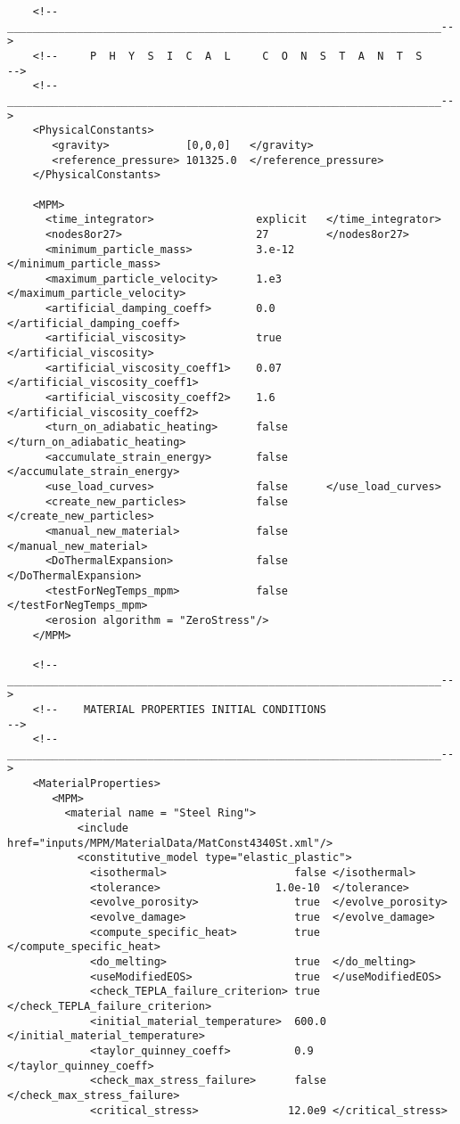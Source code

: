 \begin{verbatim}
    <!--____________________________________________________________________-->
    <!--     P  H  Y  S  I  C  A  L     C  O  N  S  T  A  N  T  S           -->
    <!--____________________________________________________________________-->   
    <PhysicalConstants>
       <gravity>            [0,0,0]   </gravity>
       <reference_pressure> 101325.0  </reference_pressure>
    </PhysicalConstants>

    <MPM>
      <time_integrator>                explicit   </time_integrator>
      <nodes8or27>                     27         </nodes8or27>
      <minimum_particle_mass>          3.e-12     </minimum_particle_mass>
      <maximum_particle_velocity>      1.e3       </maximum_particle_velocity>
      <artificial_damping_coeff>       0.0        </artificial_damping_coeff>
      <artificial_viscosity>           true       </artificial_viscosity>
      <artificial_viscosity_coeff1>    0.07       </artificial_viscosity_coeff1>
      <artificial_viscosity_coeff2>    1.6        </artificial_viscosity_coeff2>
      <turn_on_adiabatic_heating>      false      </turn_on_adiabatic_heating>
      <accumulate_strain_energy>       false      </accumulate_strain_energy>
      <use_load_curves>                false      </use_load_curves>
      <create_new_particles>           false      </create_new_particles>
      <manual_new_material>            false      </manual_new_material>
      <DoThermalExpansion>             false      </DoThermalExpansion>
      <testForNegTemps_mpm>            false      </testForNegTemps_mpm>
      <erosion algorithm = "ZeroStress"/>
    </MPM>

    <!--____________________________________________________________________-->
    <!--    MATERIAL PROPERTIES INITIAL CONDITIONS                          -->
    <!--____________________________________________________________________-->
    <MaterialProperties>
       <MPM>
         <material name = "Steel Ring">
           <include href="inputs/MPM/MaterialData/MatConst4340St.xml"/>
           <constitutive_model type="elastic_plastic">
             <isothermal>                    false </isothermal>
             <tolerance>                  1.0e-10  </tolerance>
             <evolve_porosity>               true  </evolve_porosity>
             <evolve_damage>                 true  </evolve_damage>
             <compute_specific_heat>         true  </compute_specific_heat>
             <do_melting>                    true  </do_melting>
             <useModifiedEOS>                true  </useModifiedEOS>
             <check_TEPLA_failure_criterion> true  </check_TEPLA_failure_criterion>
             <initial_material_temperature>  600.0 </initial_material_temperature>
             <taylor_quinney_coeff>          0.9   </taylor_quinney_coeff>
             <check_max_stress_failure>      false </check_max_stress_failure>
             <critical_stress>              12.0e9 </critical_stress>


\end{verbatim}
